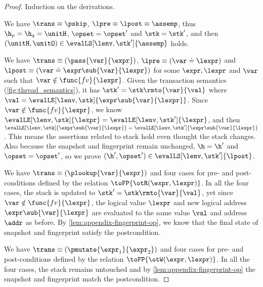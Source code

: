 \begin{proof}
Induction on the derivations.


We have \(\trans \equiv \pskip\), \( \lpre \equiv \lpost \equiv \assemp \), thus \( \h_{p} = \h_{q} = \unitH \), \( \opset = \opset' \) and \( \stk = \stk' \), and then \( (\unitH,\unitO ) \in \evalLS[\lenv, \stk']{\assemp} \) holds.


We have \(\trans \equiv ( \pass{\var}{\expr} ) \), \( \lpre \equiv ( \var \doteq \lexpr ) \) and \( \lpost \equiv ( \var \doteq \expr\sub{\var}{\lexpr} ) \) 
for some \( \expr, \lexpr \) and \( \var \) such that \( \var \notin \func{fv}{\lexpr}\).
Given the transaction semantics (\cref{fig:thread_semantics}), it has \( \stk' = \stk\rmto{\var}{\val} \) where \( \val = \evalLE[\lenv, \stk]{\expr\sub{\var}{\lexpr}} \).
Since \( \var \notin \func{fv}{\lexpr} \), we know \( \evalLE[\lenv, \stk]{\lexpr} = \evalLE[\lenv, \stk']{\lexpr} \), and then \( \evalLE[\lenv, \stk]{\expr\sub{\var}{\lexpr}} = \evalLE[\lenv, \stk']{\expr\sub{\var}{\lexpr}} \).
This means the assertions related to stack hold even thought the stack changes.
Also because the snapshot and fingerprint remain unchanged, \ie \( \h = \h' \) and \( \opset = \opset' \), so we prove \( (\h', \opset' ) \in \evalLS[\lenv, \stk']{\lpost} \).


We have \(\trans \equiv ( \plookup{\var}{\expr} ) \) and four cases for pre- and post-conditions defined by the relation \( \toFP{\otR(\expr, \lexpr)}\).
In all the four cases, the stack is updated to \( \stk' = \stk\rmto{\var}{\val} \), yet since \( \var \notin \func{fv}{\lexpr}\), the logical value \( \lexpr \) and new logical address \( \expr\sub{\var}{\lexpr}\) are evaluated to the same value \( \val \) and address \( \addr \) as before.
By \cref{lem:appendix-fingerprint-op}, we know that the final state of snapshot and fingerprint satisfy the postcondition.


We have  \( \trans \equiv (\pmutate{\expr_{1}}{\expr_{2}}) \) and four cases for pre- and post-conditions defined by the relation \( \toFP{\otW(\expr, \lexpr)}\). 
In all the four cases, the stack remains untouched and  by \cref{lem:appendix-fingerprint-op} the snapshot and fingerprint match the postcondition.



\end{proof}
